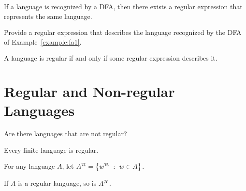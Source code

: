 \documentclass[twoside,letterpaper,openany]{book}
\begin{document}
\begin{lemma2}
If a language is recognized by a DFA, then there exists a regular expression that represents the same language.
\end{lemma2}

\begin{exer2}
Provide a regular expression that describes the language recognized by the DFA of Example~\ref{example:fa1}.
\end{exer2}

\begin{thm2}
A language is regular if and only if some regular expression describes it.
\end{thm2}

\clearpage

\section{Regular and Non-regular Languages}

\begin{discussion}
Are there languages that are not regular?
\end{discussion}


\begin{thm2}
Every finite language is regular.
\end{thm2}

\begin{defn}
For any language $A$, let $A^{\mathcal{R}} = \left\lbrace w^{\mathcal{R}}\ :\ w \in A \right\rbrace$. 
\end{defn}

\begin{thm2}
If $A$ is a regular language, so is $A^{\mathcal{R}}$.
\end{thm2}
\end{document}
